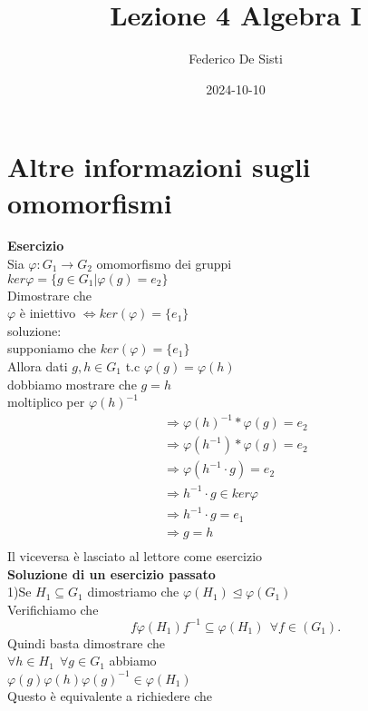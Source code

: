 \documentclass[12px]{article}
\title{Lezione 4 Algebra I}
\date{2024-10-10}
\author{Federico De Sisti}
\begin{document}
	\maketitle
	\newpage
	\section{Altre informazioni sugli omomorfismi}
	\textbf{Esercizio}\\
	Sia $ \varphi: G_1 \rightarrow G_2$ omomorfismo dei gruppi\\
	$ker \varphi = \lbrace g\in G_1 | \varphi(g) = e_2\rbrace$\\
	Dimostrare che\\
	$ \varphi$ è iniettivo $ \Leftrightarrow ker( \varphi) = \lbrace e_1 \rbrace$ \\
	soluzione:\\
	supponiamo che $ker ( \varphi) = \lbrace e_1\rbrace$\\
	Allora dati $g,h \in G_1$ t.c $ \varphi (g) = \varphi(h)$\\
	dobbiamo mostrare che $g=h$\\
	moltiplico per  $ \varphi(h)^{-1}$\\
	\begin{gather*}
		\Rightarrow \varphi(h)^{-1} * \varphi(g) = e_2\\
		\Rightarrow \varphi(h^{-1})* \varphi(g) = e_2\\
		\Rightarrow \varphi(h^{-1}\cdot g) = e_2\\
	 \Rightarrow h^{-1}\cdot g\in ker \varphi\\
	 \Rightarrow h^{-1}\cdot g = e_1\\
	 \Rightarrow g = h\\
	\end{gather*}
	Il viceversa è lasciato  al lettore come esercizio\\
	\textbf{Soluzione di un esercizio passato}\\
	1)Se $H_1\subseteq G_1$ dimostriamo che $ \varphi(H_1)\trianglelefteq \varphi(G_1)$\\
	Verifichiamo che\\
	\[
		f \varphi(H_1) f^{-1}\subseteq \varphi(H_1) \ \ \forall f\in (G_1)
	.\] 
	Quindi basta dimostrare che\\
	$\forall h\in H_1 \ \ \forall g\in G_1$ abbiamo\\
	$ \varphi(g) \varphi(h) \varphi(g)^{-1}\in \varphi(H_1)$\\
	Questo è equivalente a richiedere che\\
\end{document}
